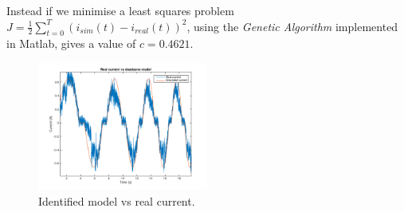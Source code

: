 Instead if we minimise a least squares problem $J = \frac{1}{2} \sum_{t=0}^T (i_{sim}(t) -i_{real}(t))^2$, using the \emph{Genetic Algorithm} implemented in Matlab, gives a value of $c =0.4621$.
  \begin{figure}[!h]
  \centering
  \includegraphics[width=0.5\textwidth]{img/deadzone3.png}
  \caption{Identified model vs real current.}
    \label{fig:deadzone_sim}
\end{figure}
